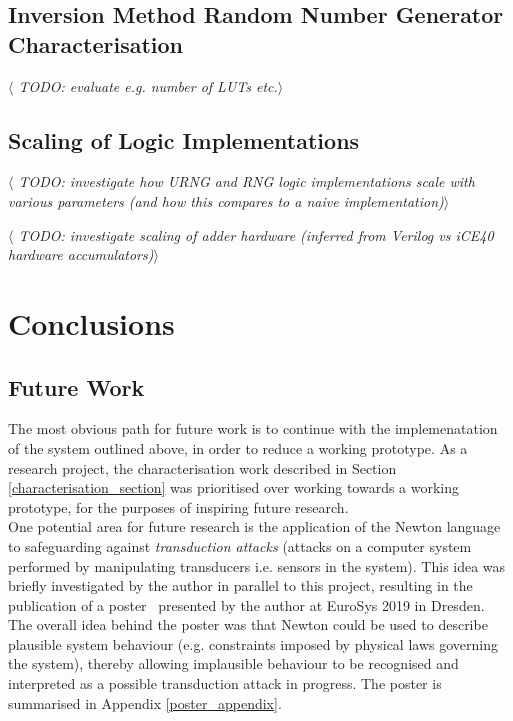 \documentclass[12pt]{article}
\begin{document}
  \subsection{Inversion Method Random Number Generator Characterisation}
    \textit{$\langle$ TODO: evaluate e.g. number of LUTs etc.$\rangle$}

  \subsection{Scaling of Logic Implementations}
    \textit{$\langle$ TODO: investigate how URNG and RNG logic implementations scale with various parameters (and how this compares to a naive implementation)$\rangle$}

    \textit{$\langle$ TODO: investigate scaling of adder hardware (inferred from Verilog vs iCE40 hardware accumulators)$\rangle$}

\newpage



%
%

\section{Conclusions}

  \subsection{Future Work}
    The most obvious path for future work is to continue with the implemenatation of the system outlined above, in order to reduce a working prototype. As a research project, the characterisation work described in Section \ref{characterisation_section} was prioritised over working towards a working prototype, for the purposes of inspiring future research.\\

    One potential area for future research is the application of the Newton language to safeguarding against \textit{transduction attacks} (attacks on a computer system performed by manipulating transducers i.e. sensors in the system). This idea was briefly investigated by the author in parallel to this project, resulting in the publication of a poster~\cite{eurosys_poster} presented by the author at EuroSys 2019 in Dresden. The overall idea behind the poster was that Newton could be used to describe plausible system behaviour (e.g. constraints imposed by physical laws governing the system), thereby allowing implausible behaviour to be recognised and interpreted as a possible transduction attack in progress. The poster is summarised in Appendix \ref{poster_appendix}.\\
\end{document}
